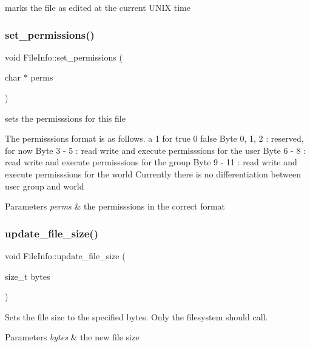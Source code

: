 marks the file as edited at the current U\+N\+IX time \mbox{\label{classFileInfo_a377208012195dba0b24723837f6db39f}} 
\subsubsection{\texorpdfstring{set\+\_\+permissions()}{set\_permissions()}}
{\footnotesize\ttfamily void File\+Info\+::set\+\_\+permissions (\begin{DoxyParamCaption}\item[{char $\ast$}]{perms }\end{DoxyParamCaption})}



sets the permisssions for this file 

The permisssions format is as follows. a 1 for true 0 false Byte 0, 1, 2 \+: reserved, for now Byte 3 -\/ 5 \+: read write and execute permisssions for the user Byte 6 -\/ 8 \+: read write and execute permisssions for the group Byte 9 -\/ 11 \+: read write and execute permisssions for the world Currently there is no differentiation between user group and world


\begin{DoxyParams}{Parameters}
{\em perms} & the permisssions in the correct format \\
\hline
\end{DoxyParams}
\mbox{\label{classFileInfo_a3c548a8dfcb6530bfef7551ac24ca473}} 
\subsubsection{\texorpdfstring{update\+\_\+file\+\_\+size()}{update\_file\_size()}}
{\footnotesize\ttfamily void File\+Info\+::update\+\_\+file\+\_\+size (\begin{DoxyParamCaption}\item[{size\+\_\+t}]{bytes }\end{DoxyParamCaption})}

Sets the file size to the specified bytes. Only the filesystem should call. 
\begin{DoxyParams}{Parameters}
{\em bytes} & the new file size \\
\hline
\end{DoxyParams}
\mbox{\label{classFileInfo_a8e835f000ddfd0f1097ccfa7e7801a09}} 

